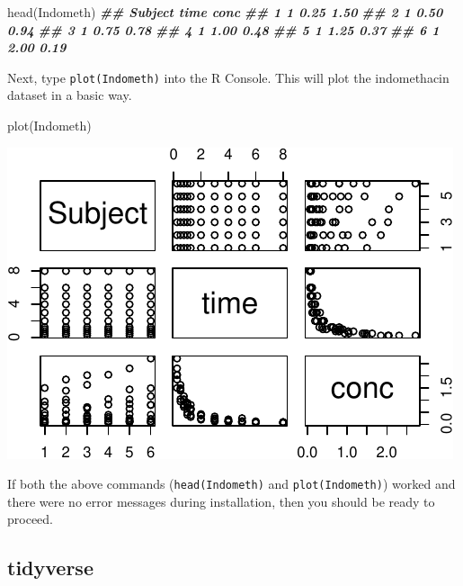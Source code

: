 \documentclass[
]{krantz}
\newenvironment{Shaded}{\begin{snugshade}}{\end{snugshade}}
\newcommand{\DocumentationTok}[1]{\textcolor[rgb]{0.56,0.35,0.01}{\textbf{\textit{#1}}}}
\newcommand{\FunctionTok}[1]{\textcolor[rgb]{0.00,0.00,0.00}{#1}}
\newcommand{\NormalTok}[1]{#1}
\begin{document}
\begin{Shaded}
\begin{Highlighting}[]
\FunctionTok{head}\NormalTok{(Indometh)}
\DocumentationTok{\#\#   Subject time conc}
\DocumentationTok{\#\# 1       1 0.25 1.50}
\DocumentationTok{\#\# 2       1 0.50 0.94}
\DocumentationTok{\#\# 3       1 0.75 0.78}
\DocumentationTok{\#\# 4       1 1.00 0.48}
\DocumentationTok{\#\# 5       1 1.25 0.37}
\DocumentationTok{\#\# 6       1 2.00 0.19}
\end{Highlighting}
\end{Shaded}

Next, type \texttt{plot(Indometh)} into the R Console. This will plot the indomethacin dataset in a basic way.

\begin{Shaded}
\begin{Highlighting}[]
\FunctionTok{plot}\NormalTok{(Indometh)}
\end{Highlighting}
\end{Shaded}

\begin{center}\includegraphics{index_files/figure-latex/unnamed-chunk-5-1} \end{center}

If both the above commands (\texttt{head(Indometh)} and \texttt{plot(Indometh)}) worked and there were no error messages during installation, then you should be ready to proceed.

\hypertarget{tidyverse}{%
\subsection{tidyverse}\label{tidyverse}}
\end{document}
